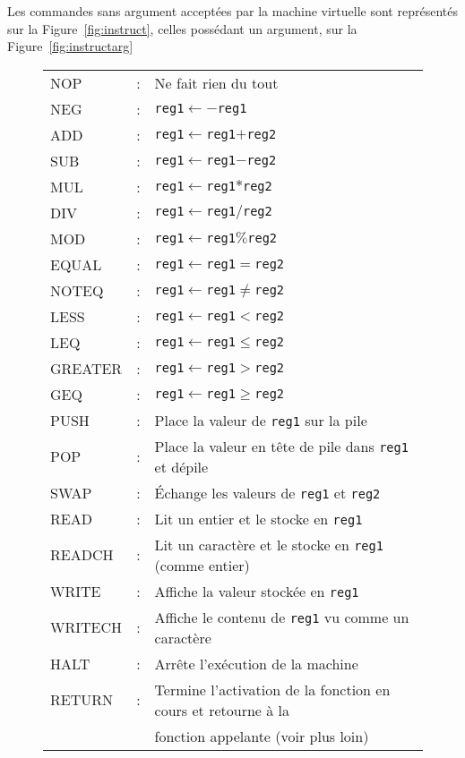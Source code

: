 \documentclass[12pt,a4]{article}
\begin{document}
Les commandes sans argument acceptées par la machine virtuelle sont
représentés sur la Figure~\ref{fig:instruct}, celles possédant un
argument, sur la Figure~\ref{fig:instructarg}

\begin{figure}
  \centering
  \begin{tabular}{lll}
    NOP   &:& Ne fait rien du tout\\
    NEG   &:& {\tt reg1}$\leftarrow-${\tt reg1}\\
    ADD   &:& {\tt reg1}$\leftarrow${\tt reg1}$+${\tt reg2}\\
    SUB   &:& {\tt reg1}$\leftarrow${\tt reg1}$-${\tt reg2}\\
    MUL   &:& {\tt reg1}$\leftarrow${\tt reg1}$*${\tt reg2}\\
    DIV   &:& {\tt reg1}$\leftarrow${\tt reg1}$/${\tt reg2}\\
    MOD   &:& {\tt reg1}$\leftarrow${\tt reg1}$\%${\tt reg2}\\
    EQUAL &:& {\tt reg1}$\leftarrow${\tt reg1}$=${\tt reg2}\\
    NOTEQ &:& {\tt reg1}$\leftarrow${\tt reg1}$\neq${\tt reg2}\\
    LESS  &:& {\tt reg1}$\leftarrow${\tt reg1}$<${\tt reg2}\\
    LEQ   &:& {\tt reg1}$\leftarrow${\tt reg1}$\leqslant${\tt reg2}\\
    GREATER &:& {\tt reg1}$\leftarrow${\tt reg1}$>${\tt reg2}\\
    GEQ   &:& {\tt reg1}$\leftarrow${\tt reg1}$\geqslant${\tt reg2}\\
    PUSH  &:& Place la valeur de {\tt reg1} sur la pile\\
    POP   &:& Place la valeur en tête de pile dans {\tt reg1} et dépile\\
    SWAP  &:& Échange les valeurs de {\tt reg1} et {\tt reg2}\\
    READ  &:& Lit un entier et le stocke en {\tt reg1}\\
    READCH  &:& Lit un caractère et le stocke en {\tt reg1} (comme entier)\\
    WRITE &:& Affiche la valeur stockée en {\tt reg1}\\
    WRITECH &:& Affiche le contenu de {\tt reg1} vu comme un caractère\\
    HALT  &:& Arrête l'exécution de la machine\\
    RETURN&:& Termine l'activation de la fonction en cours
    et retourne à la\\&& fonction appelante (voir plus loin)\\

\end{tabular}
\end{figure}
\end{document}
